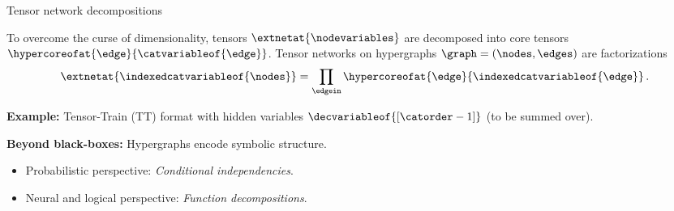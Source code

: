 \documentclass{beamer}
\begin{document}
    \begin{frame}{Tensor network decompositions}

        To overcome the curse of dimensionality, tensors $\extnetat{\nodevariables}$ are decomposed into core tensors $\hypercoreofat{\edge}{\catvariableof{\edge}}$.
        Tensor networks on hypergraphs $\graph=(\nodes,\edges)$ are factorizations
        \begin{align*}
            \extnetat{\indexedcatvariableof{\nodes}}
            = \prod_{\edgein}\hypercoreofat{\edge}{\indexedcatvariableof{\edge}} \, .
        \end{align*}

            {\bf Example:} Tensor-Train (TT) format with hidden variables $\decvariableof{[\catorder-1]}$ (to be summed over).
        \begin{center}
            
        \end{center}

            {\bf Beyond black-boxes:} Hypergraphs encode symbolic structure.
        \begin{itemize}
            \item Probabilistic perspective: \emph{Conditional independencies}.
            \item Neural and logical perspective: \emph{Function decompositions}.
        \end{itemize}

    \end{frame}
\end{document}
